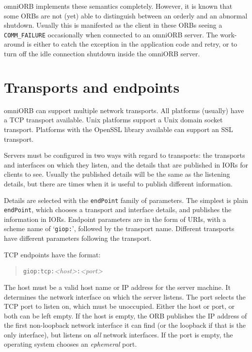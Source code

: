 \documentclass[11pt,oneside,a4paper]{book}
\newcommand{\code}[1]{\texttt{#1}}
\newcommand{\term}[1]{\textit{#1}}
\begin{document}
omniORB implements these semantics completely. However, it is known
that some ORBs are not (yet) able to distinguish between an orderly
and an abnormal shutdown. Usually this is manifested as the client in
these ORBs seeing a \code{COMM\_FAILURE} occasionally when connected
to an omniORB server. The work-around is either to catch the exception
in the application code and retry, or to turn off the idle connection
shutdown inside the omniORB server.



\section{Transports and endpoints}
\label{sec:endpoints}

omniORB can support multiple network transports. All platforms
(usually) have a TCP transport available. Unix platforms support a
Unix domain socket transport. Platforms with the OpenSSL library
available can support an SSL transport.

Servers must be configured in two ways with regard to transports: the
transports and interfaces on which they listen, and the details that
are published in IORs for clients to see. Usually the published
details will be the same as the listening details, but there are times
when it is useful to publish different information.

Details are selected with the \code{endPoint} family of parameters.
The simplest is plain \code{endPoint}, which chooses a transport and
interface details, and publishes the information in IORs. Endpoint
parameters are in the form of URIs, with a scheme name of
`\code{giop:}', followed by the transport name. Different transports
have different parameters following the transport.

TCP endpoints have the format:

\begin{quote}
\code{giop:tcp:}\textit{<host>}\code{:}\textit{<port>}
\end{quote}

\noindent The host must be a valid host name or IP address for the
server machine.  It determines the network interface on which the
server listens. The port selects the TCP port to listen on, which must
be unoccupied.  Either the host or port, or both can be left empty. If
the host is empty, the ORB publishes the IP address of the first
non-loopback network interface it can find (or the loopback if that is
the only interface), but listens on \emph{all} network interfaces. If
the port is empty, the operating system chooses an \term{ephemeral}
port.
\end{document}
